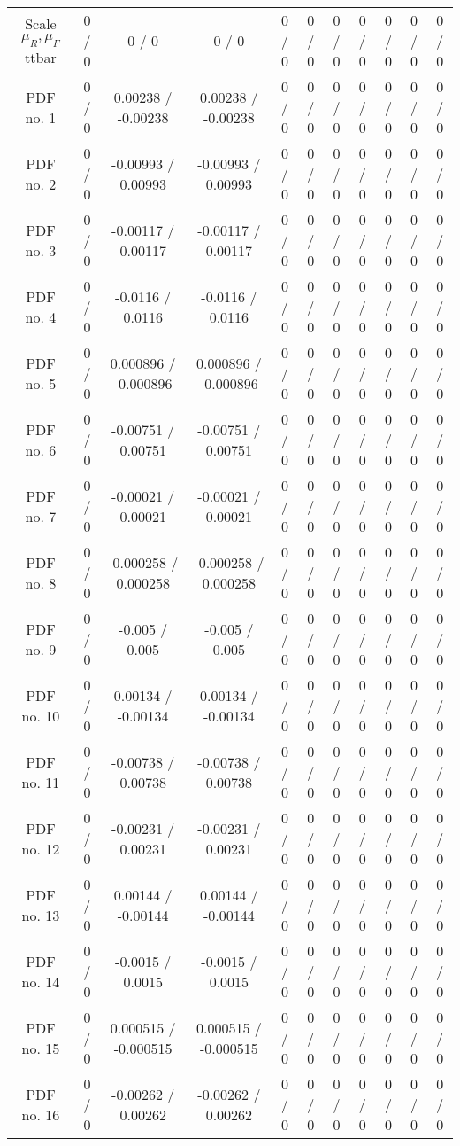 \begin{table}[htbp]
\begin{center}
\begin{tabular}{|c|c|c|c|c|c|c|c|c|c|c|}
  Scale $ \mu_{R},\mu_{F}$ ttbar & 0 / 0 & 0 / 0 & 0 / 0 & 0 / 0 & 0 / 0 & 0 / 0 & 0 / 0 & 0 / 0 & 0 / 0 & 0 / 0 \\ 
  PDF no. 1 & 0 / 0 & 0.00238 / -0.00238 & 0.00238 / -0.00238 & 0 / 0 & 0 / 0 & 0 / 0 & 0 / 0 & 0 / 0 & 0 / 0 & 0 / 0 \\ 
  PDF no. 2 & 0 / 0 & -0.00993 / 0.00993 & -0.00993 / 0.00993 & 0 / 0 & 0 / 0 & 0 / 0 & 0 / 0 & 0 / 0 & 0 / 0 & 0 / 0 \\ 
  PDF no. 3 & 0 / 0 & -0.00117 / 0.00117 & -0.00117 / 0.00117 & 0 / 0 & 0 / 0 & 0 / 0 & 0 / 0 & 0 / 0 & 0 / 0 & 0 / 0 \\ 
  PDF no. 4 & 0 / 0 & -0.0116 / 0.0116 & -0.0116 / 0.0116 & 0 / 0 & 0 / 0 & 0 / 0 & 0 / 0 & 0 / 0 & 0 / 0 & 0 / 0 \\ 
  PDF no. 5 & 0 / 0 & 0.000896 / -0.000896 & 0.000896 / -0.000896 & 0 / 0 & 0 / 0 & 0 / 0 & 0 / 0 & 0 / 0 & 0 / 0 & 0 / 0 \\ 
  PDF no. 6 & 0 / 0 & -0.00751 / 0.00751 & -0.00751 / 0.00751 & 0 / 0 & 0 / 0 & 0 / 0 & 0 / 0 & 0 / 0 & 0 / 0 & 0 / 0 \\ 
  PDF no. 7 & 0 / 0 & -0.00021 / 0.00021 & -0.00021 / 0.00021 & 0 / 0 & 0 / 0 & 0 / 0 & 0 / 0 & 0 / 0 & 0 / 0 & 0 / 0 \\ 
  PDF no. 8 & 0 / 0 & -0.000258 / 0.000258 & -0.000258 / 0.000258 & 0 / 0 & 0 / 0 & 0 / 0 & 0 / 0 & 0 / 0 & 0 / 0 & 0 / 0 \\ 
  PDF no. 9 & 0 / 0 & -0.005 / 0.005 & -0.005 / 0.005 & 0 / 0 & 0 / 0 & 0 / 0 & 0 / 0 & 0 / 0 & 0 / 0 & 0 / 0 \\ 
  PDF no. 10 & 0 / 0 & 0.00134 / -0.00134 & 0.00134 / -0.00134 & 0 / 0 & 0 / 0 & 0 / 0 & 0 / 0 & 0 / 0 & 0 / 0 & 0 / 0 \\ 
  PDF no. 11 & 0 / 0 & -0.00738 / 0.00738 & -0.00738 / 0.00738 & 0 / 0 & 0 / 0 & 0 / 0 & 0 / 0 & 0 / 0 & 0 / 0 & 0 / 0 \\ 
  PDF no. 12 & 0 / 0 & -0.00231 / 0.00231 & -0.00231 / 0.00231 & 0 / 0 & 0 / 0 & 0 / 0 & 0 / 0 & 0 / 0 & 0 / 0 & 0 / 0 \\ 
  PDF no. 13 & 0 / 0 & 0.00144 / -0.00144 & 0.00144 / -0.00144 & 0 / 0 & 0 / 0 & 0 / 0 & 0 / 0 & 0 / 0 & 0 / 0 & 0 / 0 \\ 
  PDF no. 14 & 0 / 0 & -0.0015 / 0.0015 & -0.0015 / 0.0015 & 0 / 0 & 0 / 0 & 0 / 0 & 0 / 0 & 0 / 0 & 0 / 0 & 0 / 0 \\ 
  PDF no. 15 & 0 / 0 & 0.000515 / -0.000515 & 0.000515 / -0.000515 & 0 / 0 & 0 / 0 & 0 / 0 & 0 / 0 & 0 / 0 & 0 / 0 & 0 / 0 \\ 
  PDF no. 16 & 0 / 0 & -0.00262 / 0.00262 & -0.00262 / 0.00262 & 0 / 0 & 0 / 0 & 0 / 0 & 0 / 0 & 0 / 0 & 0 / 0 & 0 / 0 \\ 

\end{tabular}
\end{center}
\end{table}
